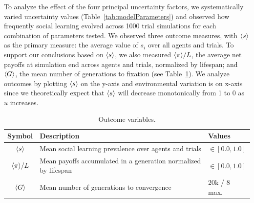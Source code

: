\documentclass[letterpaper,11.5pt]{scrartcl}
\begin{document}

To analyze the effect of the four principal uncertainty factors, we systematically
varied uncertainty values (Table~\ref{tab:modelParameters}) and observed how frequently social learning evolved across
1000 trial simulations for each combination of parameters tested. %
We observed three outcome measures, with $\langle s \rangle$ as the primary measure: the average value of $s_i$ over all agents and trials. To support our conclusions
based on $\langle s \rangle$, we also measured $\langle \pi \rangle / L$, the average net  payoffs at simulation end across agents and trials, normalized by lifespan; 
and $\langle G \rangle$, the mean
number of generations to fixation (see Table~\ref{tab:outcomeVariables}). We analyze outcomes by plotting $\langle s \rangle$ on the y-axis and environmental variation is on x-axis since we
theoretically expect that $\langle s \rangle$ will decrease monotonically from 1 to 0 as $u$
increases. %

\begin{table}[h]
    \caption{Outcome variables.}
    \label{tab:outcomeVariables}
    \centering %
    \begin{tabular}{cp{4.25in}p{0.85in}} \toprule

        Symbol & Description & Values \\ 

        \midrule  

        $\langle s \rangle$ & Mean social learning prevalence over agents and trials
                  & $\in [0.0, 1.0]$ \\

        $\langle \pi \rangle / L$ & Mean payoffs accumulated in a generation normalized by
        lifespan & $\in [0.0, 1.0]$ \\

        $\langle G \rangle$ & Mean number of generations to convergence & 20k / 8 max. \\
        \bottomrule
    \end{tabular}
\end{table}
\end{document}
